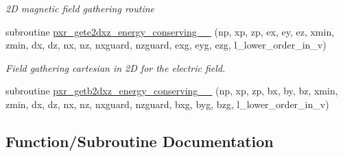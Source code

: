 \begin{DoxyCompactItemize}
\begin{DoxyCompactList}\small\item\em 2D magnetic field gathering routine \end{DoxyCompactList}\item 
subroutine \hyperlink{field__gathering__2d_8_f90_ac842cd53f1a2f6a52d1374176622815a}{pxr\+\_\+gete2dxz\+\_\+energy\+\_\+conserving\+\_\+\_} (np, xp, zp, ex, ey, ez, xmin, zmin, dx, dz, nx, nz,                                                                                                           nxguard, nzguard, exg, eyg, ezg, l\+\_\+lower\+\_\+order\+\_\+in\+\_\+v)
\begin{DoxyCompactList}\small\item\em Field gathering cartesian in 2D for the electric field. \end{DoxyCompactList}\item 
subroutine \hyperlink{field__gathering__2d_8_f90_a2717b1bd0676de944fad842e8169a3a9}{pxr\+\_\+getb2dxz\+\_\+energy\+\_\+conserving\+\_\+\_} (np, xp, zp, bx, by, bz, xmin, zmin, dx, dz, nx, nz,                                                                       nxguard, nzguard, bxg, byg, bzg, l\+\_\+lower\+\_\+order\+\_\+in\+\_\+v)
\end{DoxyCompactItemize}


\subsection{Function/\+Subroutine Documentation}
